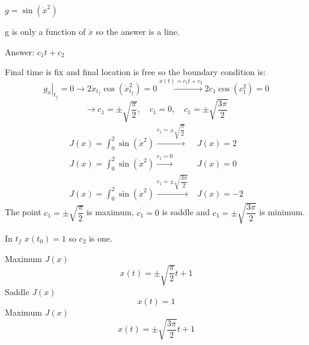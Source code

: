 $g = \sin(\dot x^2)$


g is only a function of $\dot x$ so the answer is a line.



Answer: $c_1t+c_2$


Final time is fix and final location is free so the boundary condition is:
$$ \left.g_{\dot x} \right\vert_{t_f} = 0 \to 2\dot x_{t_f}\cos(\dot x_{t_f}^2) = 0\xrightarrow{x(t) = c_1t+c_2}2c_1\cos(c_1^2) = 0$$
$$\to c_1 = \pm \sqrt{\dfrac{\pi}{2}}, \quad c_1 = 0 ,\quad c_1 = \pm \sqrt{\dfrac{3\pi}{2}}$$
\begin{align}
J(x) = \int_0^2 \sin(\dot x^2)  \xrightarrow{c_1 =\pm  \sqrt{\dfrac{\pi}{2}}}  &J(x) = 2\\
J(x) = \int_0^2 \sin(\dot x^2)  \xrightarrow{c_1 = 0 } &J(x) = 0\\
J(x) = \int_0^2 \sin(\dot x^2)  \xrightarrow{c_1 =\pm  \sqrt{\dfrac{3\pi}{2}}}  &J(x) = -2
\end{align}
The point $c_1 =\pm  \sqrt{\dfrac{\pi}{2}} $ is maximum, $c_1 =0$ is saddle and $c_1 =\pm  \sqrt{\dfrac{3\pi}{2}} $ is minimum.
﻿﻿


In $t_f$ $x(t_0) = 1$ so $c_2$ is one.


Maximum $J(x)$
$$x(t) = \pm \sqrt{\dfrac{\pi}{2}}t + 1$$
Saddle $J(x)$
$$x(t) = 1$$
Maximum $J(x)$
$$x(t) = \pm \sqrt{\dfrac{3\pi}{2}}t + 1$$